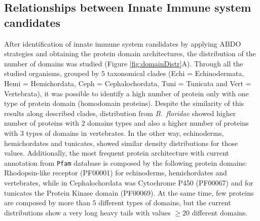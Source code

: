 \documentclass[11pt]{article}
\newcommand{\TODO}[1]{\begingroup\color{red}#1\endgroup}
\begin{document}

\subsection*{Relationships between Innate Immune system candidates} 
\label{Orthology}

After identification of innate immune system candidates by applying ABDO 
strategies and obtaining the protein domain architectures, the distribution of 
the number of domains was studied (Figure \ref{fig:domainDistr}A). Through all 
the studied organisms, grouped by $5$ taxonomical clades (Echi =  
Echinodermata, Hemi = Hemichordata, Ceph = Cephalochordata, Tuni = Tunicata 
and Vert = Vertebrata), it was possible to identify a high number of 
protein only with one type of protein domain (homodomain proteins).
Despite the similarity of this results along described clades, distribution 
from \textsl{B.\ floridae} showed higher number of proteins with $2$ domains 
types and also a higher number of proteins with $3$ types of domains 
in vertebrates. 
In the other way, echinoderms, hemichordates and tunicates, showed similar 
density distributions for those values. Additionally, the most frequent 
protein architecture with current annotation from \texttt{Pfam} database is 
composed by the following protein domains: Rhodopsin-like receptor (PF00001) 
for echinoderms, hemichordates and vertebrates, while in Cephalochordata was 
Cytochrome P450 (PF00067) and for tunicates the Protein Kinase domain 
(PF00069). At the same time, few proteins are composed by more than $5$ 
different types of domains, but the current distributions show a very long 
heavy tails with values \TODO{$\ge 20$ different domains}.
\end{document}
